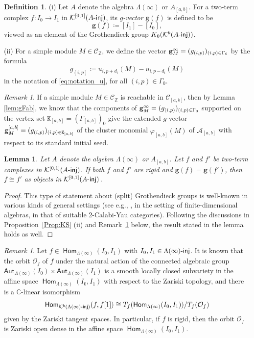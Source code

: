 \documentclass[12pt]{amsart}
\newtheorem{lemma}[theorem]{Lemma}
\theoremstyle{definition}
\newtheorem{definition}[theorem]{Definition}
\theoremstyle{remark}
\newtheorem{remark}[theorem]{Remark}
\numberwithin{equation}{section}
\newcommand{\opname}[1]{\operatorname{\mathsf{#1}}}
\newcommand{\Hom}{\opname{Hom}}
\newcommand{\injc}{\mathchar`-\mathsf{inj}}
\begin{document}
\begin{definition}\label{def:gvec}
(i)  Let $A$ denote the algebra $\Lambda(\infty)$ or $A_{[a,b]}$. For a two-term complex $f\colon I_0 \to I_1$ in $\mathcal{K}^{[0,1]}(A\injc)$, its  {\em $g$-vector} $\mathbf{g}(f)$ 
is defined to be
 \[\mathbf{g}(f)\coloneqq [I_1]-[I_0],\]
viewed as an element of the Grothendieck group $K_0(\mathcal{K}^{b}(A\injc))$.

(ii)  For a simple module $M \in \mathcal{C}_{\mathbb{Z}}$, we define the vector ${\bf g}_M^\infty = (g_{(i,p)})_{(i,p) \in \Gamma_0}$ by the formula
\[ g_{(i,p)} \coloneqq u_{i,p+d_i}(M) - u_{i,p-d_i}(M)\]
in the notation of \eqref{eq:notation_u}, for all $(i,p) \in \Gamma_0$. 
\end{definition}
\begin{remark}\label{rem:reach-g-vector}
If a simple module $M\in\mathcal C_{\mathbb Z}$ is reachable in $\mathcal C_{[a,b]}$, then by Lemma \ref{lem:gFab}, we know that the components of ${\bf g}_M^\infty= (g_{(i,p)})_{(i,p) \in \Gamma_0}$ supported on the vertex set $\mathtt K_{[a,b]}=(\Gamma_{[a,b]})_0$ give the extended $g$-vector ${\bf g}_M^{[a,b]}=(g_{(i,p)})_{(i,p) \in \mathtt K_{[a,b]}}$ of the cluster monomial $\varphi_{[a,b]}(M)$ of $\mathcal A_{[a,b]}$ with respect to its standard initial seed. 
\end{remark}

\begin{lemma}\label{lem:gvec-rigid}
 Let $A$ denote the algebra $\Lambda(\infty)$ or $A_{[a,b]}$.
Let $f$ and $f'$ be two-term complexes in $\mathcal{K}^{[0,1]}(A\injc)$. If both $f$ and $f'$ are rigid and $\mathbf{g}(f) = \mathbf{g}(f')$, then $f \cong f'$ as objects in $\mathcal{K}^{[0,1]}(A\injc)$.
\end{lemma}
\begin{proof}
    This type of statement about (split) Grothendieck groups is well-known in various kinds of general settings (see e.g., \cite[Theorem~10]{EJR18}, \cite[Theorem~5.5]{air_2014} in the setting of finite-dimensional algebras, \cite[Theorem~2.3]{DK08} in that of suitable $2$-Calabi-Yau categories). Following the discussions in Proposition~\ref{Prop:KS} (ii) and Remark~\ref{rem:T_X} below, the result stated in the lemma holds as well.
\end{proof}

\begin{remark}\label{rem:T_X}
Let $f\in \Hom_{\Lambda(\infty)}(I_0, I_1)$ with  $I_0, I_1\in \Lambda(\infty)\injc$. It is  known that the orbit $\mathcal{O}_f$ of $f$ under the natural action of the connected algebraic group $\mathsf{Aut}_{\Lambda(\infty)}(I_0) \times \mathsf{Aut}_{\Lambda(\infty)}(I_1)$ is a smooth locally closed subvariety in the affine space $\Hom_{\Lambda(\infty)}(I_0, I_1)$ with respect to the Zariski topology, and there is a $\mathbb{C}$-linear isomorphism
$$\Hom_{\mathcal{K}^b(\Lambda(\infty)\injc)}(f, f[1])\cong T_f(\Hom_{\Lambda(\infty)}(I_0,I_1))/T_f(\mathcal{O}_f)$$ given by the Zariski tangent spaces. In particular, if $f$ is rigid, then the orbit $\mathcal{O}_f$ is Zariski open dense in the affine space $\Hom_{\Lambda(\infty)}(I_0, I_1)$.
\end{remark}
\end{document}
